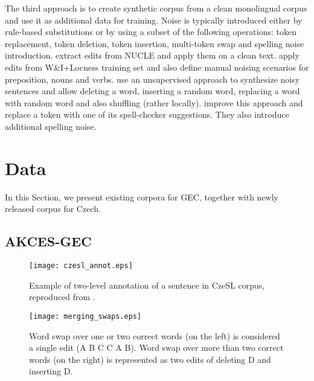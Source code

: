 \documentclass[11pt,a4paper]{article}
\begin{document}
The third approach is to create synthetic corpus from a clean monolingual corpus and use it as additional data for training. Noise is typically introduced either by rule-based substitutions or by using a subset of the following operations: token replacement, token deletion, token insertion, multi-token swap and spelling noise introduction.  extract edits from NUCLE and apply them on a clean text.  apply edits from W\&I+Locness training set and also define manual noising scenarios for preposition, nouns and verbs.  use an unsupervised approach to synthesize noisy sentences and allow deleting a word, inserting a random word, replacing a word with random word and also shuffling (rather locally).  improve this approach and replace a token with one of its spell-checker suggestions. They also introduce additional spelling noise.
 



\section{Data}

In this Section, we present existing corpora for GEC, together with newly released corpus for Czech.


\subsection{AKCES-GEC}

\begin{figure*}[ht!]
    \centering
    \texttt{[image: czesl\_annot.eps]}
    \caption{Example of two-level annotation of a sentence in CzeSL corpus, reproduced from \cite{Rosen:2016a}.}
    \label{fig:czesl_annot}
\end{figure*}

\begin{figure*}[ht!]
    \centering
    \texttt{[image: merging\_swaps.eps]}
    \caption{Word swap over one or two correct words (on the left) is considered
    a single edit (A B C C A B). Word swap over more than
    two correct words (on the right) is represented as two edits of deleting D and inserting D.}
    \label{fig:merging_swaps}
\end{figure*}
\end{document}
